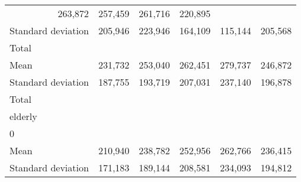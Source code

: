\begin{tabular}{llllll}
  \multicolumn{1}{r}{263,872} &
  \multicolumn{1}{r}{257,459} &
  \multicolumn{1}{r}{261,716} &
  \multicolumn{1}{r}{220,895} \\
\multicolumn{1}{l}{\hspace{4em}Standard deviation} &
  \multicolumn{1}{|r}{205,946} &
  \multicolumn{1}{r}{223,946} &
  \multicolumn{1}{r}{164,109} &
  \multicolumn{1}{r}{115,144} &
  \multicolumn{1}{r}{205,568} \\
\multicolumn{1}{l}{\hspace{3em}Total} &
  \multicolumn{1}{|r}{} &
  \multicolumn{1}{r}{} &
  \multicolumn{1}{r}{} &
  \multicolumn{1}{r}{} &
  \multicolumn{1}{r}{} \\
\multicolumn{1}{l}{\hspace{4em}Mean} &
  \multicolumn{1}{|r}{231,732} &
  \multicolumn{1}{r}{253,040} &
  \multicolumn{1}{r}{262,451} &
  \multicolumn{1}{r}{279,737} &
  \multicolumn{1}{r}{246,872} \\
\multicolumn{1}{l}{\hspace{4em}Standard deviation} &
  \multicolumn{1}{|r}{187,755} &
  \multicolumn{1}{r}{193,719} &
  \multicolumn{1}{r}{207,031} &
  \multicolumn{1}{r}{237,140} &
  \multicolumn{1}{r}{196,878} \\
\multicolumn{1}{l}{\hspace{1em}Total} &
  \multicolumn{1}{|r}{} &
  \multicolumn{1}{r}{} &
  \multicolumn{1}{r}{} &
  \multicolumn{1}{r}{} &
  \multicolumn{1}{r}{} \\
\multicolumn{1}{l}{\hspace{2em}elderly} &
  \multicolumn{1}{|r}{} &
  \multicolumn{1}{r}{} &
  \multicolumn{1}{r}{} &
  \multicolumn{1}{r}{} &
  \multicolumn{1}{r}{} \\
\multicolumn{1}{l}{\hspace{3em}0} &
  \multicolumn{1}{|r}{} &
  \multicolumn{1}{r}{} &
  \multicolumn{1}{r}{} &
  \multicolumn{1}{r}{} &
  \multicolumn{1}{r}{} \\
\multicolumn{1}{l}{\hspace{4em}Mean} &
  \multicolumn{1}{|r}{210,940} &
  \multicolumn{1}{r}{238,782} &
  \multicolumn{1}{r}{252,956} &
  \multicolumn{1}{r}{262,766} &
  \multicolumn{1}{r}{236,415} \\
\multicolumn{1}{l}{\hspace{4em}Standard deviation} &
  \multicolumn{1}{|r}{171,183} &
  \multicolumn{1}{r}{189,144} &
  \multicolumn{1}{r}{208,581} &
  \multicolumn{1}{r}{234,093} &
  \multicolumn{1}{r}{194,812} \\

\end{tabular}
